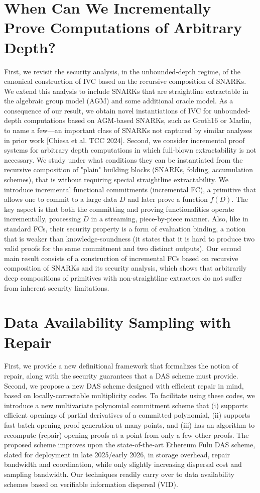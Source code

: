 \documentclass[11pt,oneside]{book}
\theoremstyle{definition}
\theoremstyle{remark}
\theoremstyle{plain}
\begin{document}
\section{\cite{cryptoeprint:2025/1413} When Can We Incrementally Prove Computations of Arbitrary Depth?}
First, we revisit the security analysis, in the unbounded-depth regime, of the canonical construction of IVC based on the recursive composition of SNARKs. We extend this analysis to include SNARKs that are straightline extractable in the algebraic group model (AGM) and some additional oracle model. As a consequence of our result, we obtain novel instantiations of IVC for unbounded-depth computations based on AGM-based SNARKs, such as Groth16 or Marlin, to name a few—an important class of SNARKs not captured by similar analyses in prior work [Chiesa et al. TCC 2024]. Second, we consider incremental proof systems for arbitrary depth computations in which full-blown extractability is not necessary. We study under what conditions they can be instantiated from the recursive composition of "plain" building blocks (SNARKs, folding, accumulation schemes), that is without requiring special straightline extractability. We introduce incremental functional commitments (incremental FC), a primitive that allows one to commit to a large data $D$ and later prove a function $f(D)$. The key aspect is that both the committing and proving functionalities operate incrementally, processing $D$ in a streaming, piece-by-piece manner. Also, like in standard FCs, their security property is a form of evaluation binding, a notion that is weaker than knowledge-soundness (it states that it is hard to produce two valid proofs for the same commitment and two distinct outputs). Our second main result consists of a construction of incremental FCs based on recursive composition of SNARKs and its security analysis, which shows that arbitrarily deep compositions of primitives with non-straightline extractors do not suffer from inherent security limitations.

\section{\cite{cryptoeprint:2025/1414} Data Availability Sampling with Repair}
First, we provide a new definitional framework that formalizes the notion of repair, along with the security guarantees that a DAS scheme must provide. Second, we propose a new DAS scheme designed with efficient repair in mind, based on locally-correctable multiplicity codes. To facilitate using these codes, we introduce a new multivariate polynomial commitment scheme that (i) supports efficient openings of partial derivatives of a committed polynomial, (ii) supports fast batch opening proof generation at many points, and (iii) has an algorithm to recompute (repair) opening proofs at a point from only a few other proofs. The proposed scheme improves upon the state-of-the-art Ethereum Fulu DAS scheme, slated for deployment in late 2025/early 2026, in storage overhead, repair bandwidth and coordination, while only slightly increasing dispersal cost and sampling bandwidth. Our techniques readily carry over to data availability schemes based on verifiable information dispersal (VID).
\end{document}
